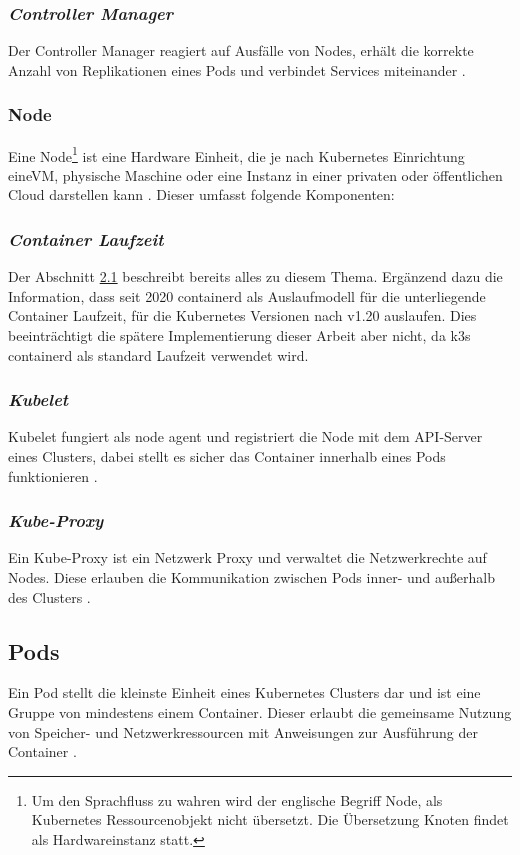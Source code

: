\subsubsection{\textit{Controller Manager}}
Der Controller Manager reagiert auf Ausfälle von Nodes, erhält die korrekte
Anzahl von Replikationen eines Pods und verbindet Services miteinander \cite{kuberneteskomponenten}.

\subsubsection{Node}
Eine Node\footnote{Um den Sprachfluss zu wahren wird der englische Begriff Node, als Kubernetes Ressourcenobjekt nicht übersetzt. 
Die Übersetzung Knoten findet als Hardwareinstanz statt.} 
ist eine Hardware Einheit, die je nach Kubernetes Einrichtung eineVM, physische Maschine oder 
eine Instanz in einer privaten oder öffentlichen Cloud darstellen kann \cite{kubernetesnodes}.
Dieser umfasst folgende Komponenten:

\subsubsection{\textit{Container Laufzeit}}
Der Abschnitt \hyperref[Docker]{2.1} beschreibt bereits alles zu diesem Thema.
Ergänzend dazu die Information, dass seit 2020 containerd als Auslaufmodell für die unterliegende Container Laufzeit, 
für die Kubernetes Versionen nach v1.20 auslaufen. Dies beeinträchtigt die spätere Implementierung dieser Arbeit aber nicht,
da k3s containerd als standard Laufzeit verwendet wird.

\subsubsection{\textit{Kubelet}}
Kubelet fungiert als \glqq node agent\grqq{} und registriert die Node mit dem
API-Server eines Clusters, dabei stellt es sicher das Container innerhalb eines Pods
funktionieren \cite{kubernetesnodes}.

\subsubsection{\textit{Kube-Proxy}}
Ein Kube-Proxy ist ein Netzwerk Proxy und verwaltet die Netzwerkrechte auf Nodes.
Diese erlauben die Kommunikation zwischen Pods inner- und außerhalb des Clusters \cite{kubernetesnodes}.

\subsection{Pods}
Ein Pod stellt die kleinste Einheit eines Kubernetes Clusters dar und ist eine Gruppe von mindestens einem Container.
Dieser erlaubt die gemeinsame Nutzung von Speicher- und Netzwerkressourcen mit Anweisungen zur Ausführung der Container \cite{kubernetespods}.

